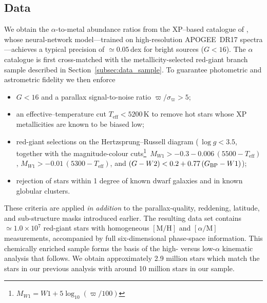 \documentclass[a4paper,12pt]{article}
\begin{document}
\subsection{Data}


We obtain the $\alpha$-to-metal abundance ratios from the
XP–based catalogue of \citet{Li2024}, whose neural-network
model—trained on high-resolution \textsc{APOGEE}~DR17
spectra—achieves a typical precision of $\simeq0.05$\,dex for
bright sources ($G<16$).  
The $\alpha$ catalogue is first cross-matched with the
metallicity-selected red-giant branch sample described in
Section~\ref{subsec:data_sample}.  
To guarantee photometric and astrometric fidelity we then enforce

\begin{itemize}\setlength\itemsep{2pt}
  \item $G<16$ and a parallax signal-to-noise ratio
        $\varpi/\sigma_\varpi>5$;
  \item an effective–temperature cut $T_{\!\mathrm{eff}}<5200$\,K
        to remove hot stars whose XP metallicities are known to
        be biased low;
  \item red-giant selections on the Hertzsprung–Russell diagram
        (\,$\log g<3.5$, together with the magnitude-colour
        cuts\footnote{$M_{W1}=W1+5\log_{10}(\varpi/100)$}\,
        $M_{W1}>-0.3-0.006\,(5500-T_{\!\mathrm{eff}})$,
        $M_{W1}>-0.01\,(5300-T_{\!\mathrm{eff}})$, and
        $(G-W2)<0.2+0.77\,(G_{\rm BP}-W1)$);
  \item rejection of stars within 1 degree of known dwarf galaxies and
        in known globular clusters.
\end{itemize}

These criteria are applied \emph{in addition} to the parallax-quality,
reddening, latitude, and sub-structure masks introduced earlier.
The resulting data set contains $\simeq1.0\times10^{7}$
red-giant stars with homogeneous $[\mathrm{M/H}]$ and
$[\alpha/\mathrm{M}]$ measurements, accompanied by full six-dimensional
phase-space information.  This chemically enriched sample forms
the basis of the high- versus low-$\alpha$ kinematic analysis that
follows.
We obtain approximately 2.9 million stars which match the stars in our previous
analysis with around 10 million stars in our sample.
\end{document}
